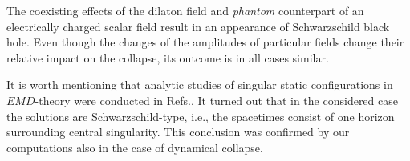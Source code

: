 \documentclass[aps,showpacs,nofootinbib,floatfix]{revtex4}
\begin{document}
The coexisting effects of the dilaton field and {\it phantom} counterpart of an electrically charged scalar 
field result in an appearance of Schwarzschild black hole. Even though the changes of the amplitudes 
of particular fields change their relative impact on the collapse, its outcome is in all cases similar. 
\par
It is worth mentioning that analytic studies of singular static configurations in $E\overline{M}D$-theory were conducted in Refs.\cite{gib96, cle09}. It turned out that in the considered case the solutions are Schwarzschild-type, i.e., the spacetimes consist of one horizon surrounding central singularity. This conclusion was confirmed by our computations also in the case of dynamical collapse.




\end{document}
